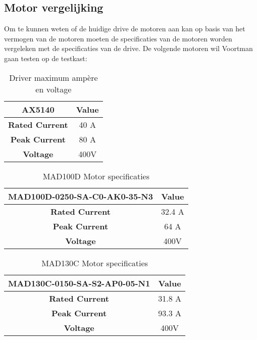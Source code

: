 \newpage

\subsection{Motor vergelijking}

Om te kunnen weten of de huidige drive de motoren aan kan op basis van het vermogen van de motoren moeten de specificaties van de motoren worden vergeleken met de specificaties van de drive. De volgende motoren wil Voortman gaan testen op de testkast:

\begin{table}[H]
	\caption{Driver maximum ampère en voltage}
	\label{tab:AX5140Max}
	\centering
	\begin{tabular}{|c|c|}
		\hline
		\textbf{AX5140} & \textbf{Value} \\
		\hline
		\textbf{Rated Current} & 40 \gls{A} \\
		\textbf{Peak Current} & 80 \gls{A} \\
		\textbf{Voltage} & 400\gls{V} \\
		\hline
	\end{tabular}
\end{table}

\begin{table}[H]
	\caption{MAD100D Motor specificaties}
	\label{tab:MAD100D}
	\centering
	\begin{tabular}{|c|c|}
		\hline
		\textbf{MAD100D-0250-SA-C0-AK0-35-N3} & \textbf{Value} \\
		\hline
		\textbf{Rated Current} & 32.4 \gls{A} \\
		\textbf{Peak Current} & 64 \gls{A} \\
		\textbf{Voltage} & 400\gls{V} \\
		\hline
	\end{tabular}
\end{table}

\begin{table}[H]
	\caption{MAD130C Motor specificaties}
	\label{tab:MAD130C}
	\centering
	\begin{tabular}{|c|c|}
		\hline
		\textbf{MAD130C-0150-SA-S2-AP0-05-N1} & \textbf{Value} \\
		\hline
		\textbf{Rated Current} & 31.8 \gls{A} \\
		\textbf{Peak Current} & 93.3 \gls{A} \\
		\textbf{Voltage} & 400\gls{V} \\
		\hline
	\end{tabular}
\end{table}

